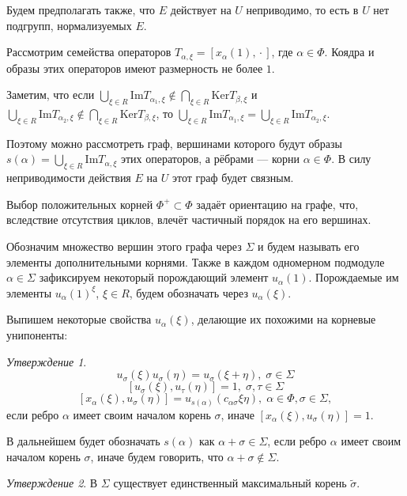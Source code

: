 \documentclass[15pt]{article}
\theoremstyle{remark}
\newtheorem{prop}{Утверждение}
\begin{document}
Будем предполагать также, что $E$ действует на $U$ неприводимо, то есть в $U$ нет подгрупп, нормализуемых $E$.

Рассмотрим семейства операторов $T_{\alpha,\xi} = [x_\alpha(1),\,\boldsymbol{\cdot}\,]$, где $\alpha \in \Phi$. Коядра и образы этих операторов имеют размерность не более $1$.

Заметим, что если $\bigcup_{\xi\in R}\mathrm{Im}T_{\alpha_1,\xi} \notin \bigcap_{\xi\in R}\mathrm{Ker}T_{\beta,\xi}$ и $\bigcup_{\xi\in R}\mathrm{Im}T_{\alpha_2,\xi} \notin \bigcap_{\xi\in R}\mathrm{Ker}T_{\beta,\xi}$, то $\bigcup_{\xi\in R}\mathrm{Im}T_{\alpha_1,\xi} = \bigcup_{\xi\in R}\mathrm{Im}T_{\alpha_2,\xi}$.

Поэтому можно рассмотреть граф, вершинами которого будут образы $s(\alpha) = \bigcup_{\xi\in R}\mathrm{Im}T_{\alpha,\xi}$ этих операторов, а рёбрами --- корни $\alpha \in \Phi$. В силу неприводимости действия $E$ на $U$ этот граф будет связным.

Выбор положительных корней $\Phi^+ \subset \Phi$ задаёт ориентацию на графе, что, вследствие отсутствия циклов, влечёт частичный порядок на его вершинах.

Обозначим множество вершин этого графа через $\Sigma$ и будем называть его элементы дополнительными корнями. Также в каждом одномерном подмодуле $\alpha \in \Sigma$ зафиксируем некоторый порождающий элемент $u_\alpha(1)$. Порождаемые им элементы $u_\alpha(1)^\xi$, $\xi \in R$, будем обозначать через $u_\alpha(\xi)$.

Выпишем некоторые свойства $u_\alpha(\xi)$, делающие их похожими на корневые унипоненты:

\begin{prop}
  $$ u_\sigma(\xi) u_\sigma(\eta) = u_\sigma(\xi + \eta), \; \sigma \in \Sigma $$
  $$ [u_\sigma(\xi), u_\tau(\eta)] = 1, \; \sigma,\tau \in \Sigma $$
  $$ [x_\alpha(\xi), u_\sigma(\eta)] = u_{s(\alpha)}(c_{\alpha\sigma}\xi\eta), \; \alpha \in \Phi, \sigma \in \Sigma,$$ если ребро $\alpha$ имеет своим началом корень $\sigma$, иначе $ [x_\alpha(\xi), u_\sigma(\eta)]=1 $.
\end{prop}

В дальнейшем будет обозначать $s(\alpha)$ как $\alpha+\sigma \in \Sigma$, если ребро $\alpha$ имеет своим началом корень $\sigma$, иначе будем говорить, что  $\alpha+\sigma \notin \Sigma$.

\begin{prop}
  В $\Sigma$ существует единственный максимальный корень $\widetilde{\sigma}$.
\end{prop}
\end{document}
